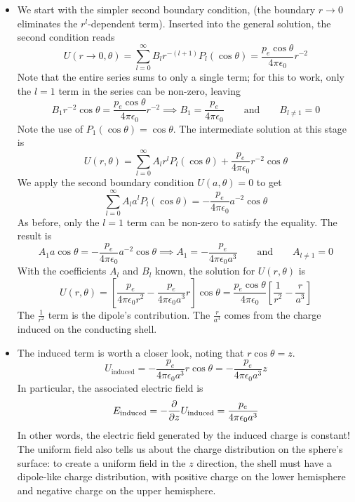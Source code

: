 \documentclass[11pt, a4paper]{article}
\newcommand{\eqtext}[1]{\qquad \text{#1} \qquad}
\newcommand{\e}{\epsilon_{0}}  %
\begin{document}
\begin{itemize}
	\item We start with the simpler second boundary condition, (the boundary $ r \to 0 $ eliminates the $ r^{l} $-dependent term). Inserted into the general solution, the second condition reads
	\begin{equation*}
		U(r\to 0, \theta) = \sum_{l = 0}^{\infty} B_{l}r^{-(l+1)}P_{l}(\cos \theta) = \frac{p_{e}\cos \theta}{4\pi \e }r^{-2}
	\end{equation*}
	Note that the entire series sums to only a single term; for this to work, only the $ l = 1 $ term in the series can be non-zero, leaving
	\begin{equation*}
		B_{1}r^{-2}\cos \theta = \frac{p_{e}\cos \theta}{4\pi \e }r^{-2} \implies B_{1} = \frac{p_{e}}{4\pi \e} \eqtext{and} B_{l\neq 1} = 0
	\end{equation*}
	Note the use of $ P_{1}(\cos \theta) = \cos \theta $. The intermediate solution at this stage is
	\begin{equation*}
		U(r, \theta) = \sum_{l = 0}^{\infty} A_{l} r^{l} P_{l}(\cos \theta) + \frac{p_{e}}{4\pi \e}r^{-2} \cos \theta
	\end{equation*}
	We apply the second boundary condition $ U(a, \theta) = 0 $ to get
	\begin{equation*}
		\sum_{l = 0}^{\infty} A_{l} a^{l} P_{l}(\cos \theta) = - \frac{p_{e}}{4\pi \e}a^{-2} \cos \theta
	\end{equation*}
	As before, only the $ l = 1 $ term can be non-zero to satisfy the equality. The result is
	\begin{equation*}
		A_{1}a\cos \theta = - \frac{p_{e}}{4\pi \e}a^{-2} \cos \theta \implies A_{1} = -\frac{p_{e}}{4\pi \e a^{3}} \eqtext{and} A_{l\neq 1} = 0
	\end{equation*}
	With the coefficients $ A_{l} $ and $ B_{l} $ known, the solution for $ U(r, \theta) $ is
	\begin{equation*}
		U(r, \theta) = \left[\frac{p_{e}}{4\pi \e r^{2}} -\frac{p_{e}}{4\pi \e a^{3}}r\right]\cos \theta = \frac{p_{e}\cos \theta}{4\pi \e}\left[\frac{1}{r^{2}} - \frac{r}{a^{3}}\right]
	\end{equation*}
	The $ \frac{1}{r^{2}} $ term is the dipole's contribution. The $ \frac{r}{a^{3}} $ comes from the charge induced on the conducting shell. 
	
	\item The induced term is worth a closer look, noting that $ r\cos \theta = z $. 
	\begin{equation*}
		U_{\text{induced}} = -\frac{p_{e}}{4\pi \e a^{3}}r\cos \theta = -\frac{p_{e}}{4\pi \e a^{3}}z
	\end{equation*}
	In particular, the associated electric field is
	\begin{equation*}
		E_{\text{induced}} = -\pdv{z}U_{\text{induced}} = \frac{p_{e}}{4\pi \e a^{3}}
	\end{equation*}
	In other words, the electric field generated by the induced charge is constant! The uniform field also tells us about the charge distribution on the sphere's surface: to create a uniform field in the $ z $ direction, the shell must have a dipole-like charge distribution, with positive charge on the lower hemisphere and negative charge on the upper hemisphere. 
	

\end{itemize}
\end{document}
